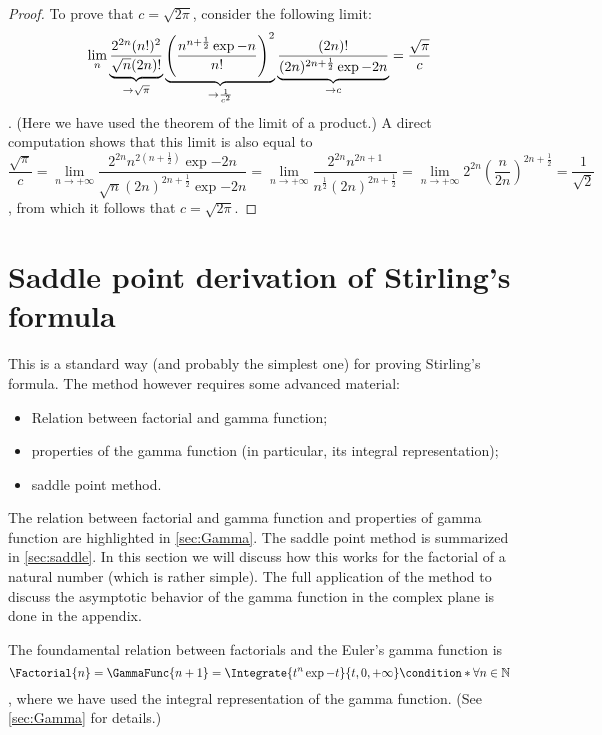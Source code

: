 \documentclass[onecolumn,a4paper,11pt]{article}
\newcommand{\numberset}{\mathbb}
\providecommand{\N}{\numberset{N}}
\theoremstyle{classicdef}
\theoremstyle{remark}
\begin{document}
\begin{proof}
To prove that $c=\sqrt{2\pi}$, consider the following limit:
\begin{dmath*}
\lim_{n} 
\underbrace{%
\frac{2^{2n} (n!)^{2}}{\sqrt{n} (2n)!} 
}_{\rightarrow \sqrt{\pi}}\underbrace{%
\left(
\frac{n^{n+\frac{1}{2}}\exp{-n}}{n!} \right)^{2} 
}_{\rightarrow \frac{1}{c^{2}}}\underbrace{%
\frac{(2n)!}{(2n)^{2n+\frac{1}{2}}
\exp{-2n}} 
}_{\rightarrow c } = \frac{\sqrt{\pi}}{c} 
\end{dmath*}.
(Here we have used the theorem of the limit of a product.)
A direct computation shows that this limit is also equal to
\begin{dmath*}
\frac{\sqrt{\pi}}{c} =
\lim_{n\rightarrow+\infty} \frac{2^{2n}  n^{2 \left( n +\frac{1}{2}
\right)} \exp{-2n}}{\sqrt{n}  (2n)^{2n+\frac{1}{2} } \exp{-2n}
} 
= \lim_{n\rightarrow+\infty} \frac{2^{2n} n^{2n+1}}{n^{\frac{1}{2}}
(2n)^{2n +\frac{1}{2}}} 
= \lim_{n\rightarrow+\infty} 2^{2n} \left( \frac{n}{2n} \right)^{2n +
\frac{1}{2}} 
= \frac{1}{\sqrt{2}}
\end{dmath*},
from which it follows that $ c= \sqrt{2\pi}$.
\end{proof}


\section{Saddle point derivation of Stirling's formula\label{sec:spm}}

This is a standard way (and probably the simplest one) for proving Stirling's formula.
The method however requires some advanced material:
\begin{itemize}
   \item Relation between factorial and gamma function;
   \item properties of the gamma function (in particular, its integral
      representation);
   \item saddle point method.
\end{itemize}
The relation between factorial and gamma function and properties of gamma
function are highlighted in
\cref{sec:Gamma}.
The saddle point method is summarized in \cref{sec:saddle}.
In this section we
will discuss how this works for the factorial of a natural number (which is rather simple).
The full application of the method to discuss the asymptotic behavior of the
gamma function in the complex plane is done in the appendix. 

The foundamental relation between factorials and the Euler's gamma
function is
\begin{dmath*}[compact]
   \Factorial{n} = \GammaFunc{n+1} = \Integrate{ t^{n} \exp{-t}}{t, 0 , +\infty} 
   \condition*{\forall n \in \N}
\end{dmath*},
where we have used the integral representation of the gamma function.
(See \cref{sec:Gamma} for details.)
\end{document}
